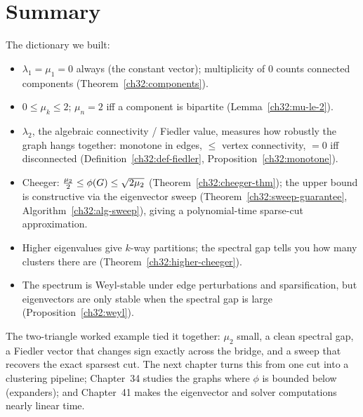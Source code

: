 \section{Summary}
\label{ch32:summary}

The dictionary we built:
\begin{itemize}
  \item $\lambda_1=\mu_1=0$ always (the constant vector); multiplicity of $0$ counts connected components (Theorem~\ref{ch32:components}).
  \item $0\le\mu_k\le 2$; $\mu_n=2$ iff a component is bipartite (Lemma~\ref{ch32:mu-le-2}).
  \item $\lambda_2$, the algebraic connectivity / Fiedler value, measures how robustly the graph hangs together: monotone in edges, $\le$ vertex connectivity, $=0$ iff disconnected (Definition~\ref{ch32:def-fiedler}, Proposition~\ref{ch32:monotone}).
  \item Cheeger: $\tfrac{\mu_2}{2}\le\phi(G)\le\sqrt{2\mu_2}$ (Theorem~\ref{ch32:cheeger-thm}); the upper bound is constructive via the eigenvector sweep (Theorem~\ref{ch32:sweep-guarantee}, Algorithm~\ref{ch32:alg-sweep}), giving a polynomial-time sparse-cut approximation.
  \item Higher eigenvalues give $k$-way partitions; the spectral gap tells you how many clusters there are (Theorem~\ref{ch32:higher-cheeger}).
  \item The spectrum is Weyl-stable under edge perturbations and sparsification, but eigenvectors are only stable when the spectral gap is large (Proposition~\ref{ch32:weyl}).
\end{itemize}

The two-triangle worked example tied it together: $\mu_2$ small, a clean spectral gap, a Fiedler vector that changes sign exactly across the bridge, and a sweep that recovers the exact sparsest cut. The next chapter turns this from one cut into a clustering pipeline; Chapter~34 studies the graphs where $\phi$ is bounded below (expanders); and Chapter~41 makes the eigenvector and solver computations nearly linear time.

